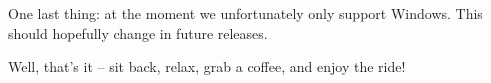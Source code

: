 One last thing: at the moment we unfortunately only support Windows. This should hopefully change in future releases.

\newpage

Well, that's it -- sit back, relax, grab a coffee, and enjoy the ride!

